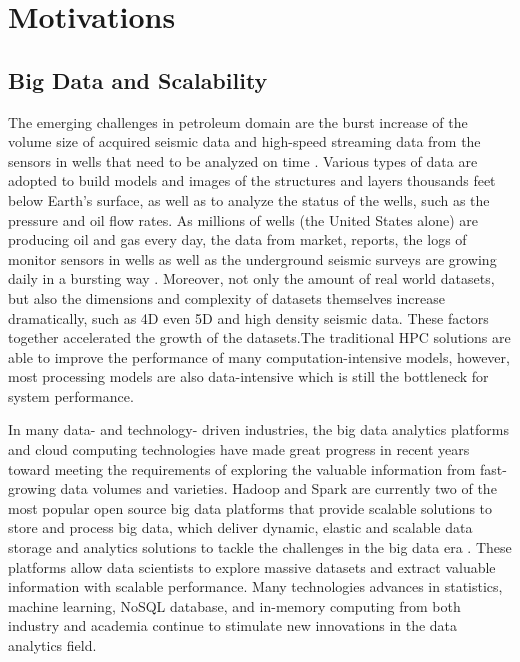 

\section{Motivations}

\subsection{Big Data and Scalability}

The emerging challenges in petroleum domain are the burst increase of the volume size of acquired seismic data and high-speed streaming data from the sensors in wells that need to be analyzed on time \cite{bigdatatooil}. Various types of data are adopted to build models and images of the structures and layers thousands feet below Earth's surface, as well as to analyze the status of the wells, such as the pressure and oil flow rates. As millions of wells (the United States alone) are producing oil and gas every day, the data from market, reports, the logs of monitor sensors in wells as well as the underground seismic surveys are growing daily in a bursting way \cite{bigdatatooil}. Moreover, not only the amount of real world datasets, but also the dimensions and complexity of datasets themselves increase dramatically, such as 4D even 5D and high density seismic data. These factors together accelerated the growth of the datasets.The traditional HPC solutions are able to improve the performance of many computation-intensive models, however,  most processing models are also data-intensive which is still the bottleneck for system performance. 

In many data- and technology- driven industries, the big data analytics platforms and cloud computing technologies have made great progress in recent years toward meeting the requirements of exploring the valuable information from fast-growing data volumes and varieties.  Hadoop and Spark are currently two of the most popular open source big data platforms that provide scalable solutions to store and process big data, which deliver dynamic, elastic and scalable data storage and analytics solutions to tackle the challenges in the big data era \cite{SparkWiki}. These platforms allow data scientists to explore massive datasets and extract valuable information with scalable performance. Many technologies advances in statistics, machine learning, NoSQL database, and in-memory computing from both industry and academia continue to stimulate new innovations in the data analytics field.

